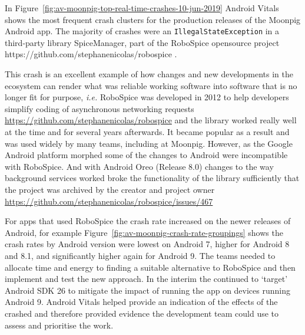 In Figure~\ref{fig:av-moonpig-top-real-time-crashes-10-jun-2019} Android Vitals shows the most frequent crash clusters for the production releases of the Moonpig Android app. The majority of crashes were an \texttt{IllegalStateException} in a third-party library SpiceManager, part of the RoboSpice opensource project https://github.com/stephanenicolas/robospice . 

This crash is an excellent example of how changes and new developments in the ecosystem can render what was reliable working software into software that is no longer fit for purpose, \emph{i.e.} RoboSpice was developed in 2012 to help developers simplify coding of asynchronous networking requests \url{https://github.com/stephanenicolas/robospice} and the library worked really well at the time and for several years afterwards. It became popular as a result and was used widely by many teams, including at Moonpig. However, as the Google Android platform morphed some of the changes to Android were incompatible with RoboSpice. And with Android Oreo (Release 8.0) changes to the way background services worked broke the functionality of the library sufficiently that the project was archived by the creator and project owner \url{https://github.com/stephanenicolas/robospice/issues/467} 

For apps that used RoboSpice the crash rate increased on the newer releases of Android, for example Figure~\ref{fig:av-moonpig-crash-rate-groupings} shows the crash rates by Android version were lowest on Android 7, higher for Android 8 and 8.1, and significantly higher again for Android 9. The teams needed to allocate time and energy to finding a suitable alternative to RoboSpice and then implement and test the new approach. In the interim the continued to `target' Android SDK 26 to mitigate the impact of running the app on devices running Android 9. Android Vitals helped provide an indication of the effects of the crashed and therefore provided evidence the development team could use to assess and prioritise the work.

